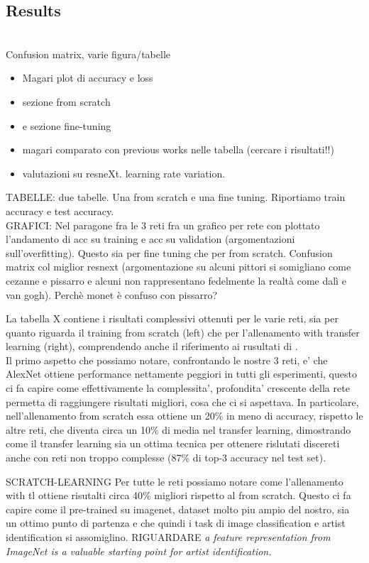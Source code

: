 \documentclass{article}
\begin{document}
\subsection{Results}\mbox{}\\

Confusion matrix, varie figura/tabelle
\begin{itemize}
	\item Magari plot di accuracy e loss
	\item sezione from scratch 
	\item e sezione fine-tuning
	\item magari comparato con previous works nelle tabella (cercare i risultati!!)
	\item valutazioni su resneXt. learning rate variation. 
\end{itemize}
TABELLE: due tabelle. Una from scratch e una fine tuning. Riportiamo train accuracy e test accuracy. \\
GRAFICI: Nel paragone fra le 3 reti fra un grafico per rete con plottato l'andamento di acc su training e acc su validation (argomentazioni sull'overfitting). Questo sia per fine tuning che per from scratch. Confusion matrix col miglior resnext (argomentazione su alcuni pittori si somigliano come cezanne e pissarro e alcuni non rappresentano fedelmente la realtà come dalì e van gogh). Perchè monet è confuso con pissarro?

La tabella X contiene i risultati complessivi ottenuti per le varie reti, sia per quanto riguarda il training from scratch (left) che per l'allenamento with transfer learning (right), comprendendo anche il riferimento ai rusultati di \cite{ArtistIdCNN406}.\\
Il primo aspetto che possiamo notare, confrontando le nostre 3 reti, e' che AlexNet ottiene performance nettamente peggiori in tutti gli esperimenti, questo ci fa capire come effettivamente la complessita', profondita' crescente della rete permetta di raggiungere risultati migliori, cosa che ci si aspettava.
In particolare, nell'allenamento from scratch essa ottiene un 20\% in meno di accuracy, rispetto le altre reti, che diventa circa un 10\% di media nel transfer learning, dimostrando come il transfer learning sia un ottima tecnica per ottenere rislutati discereti anche con reti non troppo complesse (87\% di top-3 accuracy nel test set).

SCRATCH-LEARNING
Per tutte le reti possiamo notare come l'allenamento with tl ottiene risutalti circa 40\% migliori rispetto al from scratch. Questo ci fa capire come il pre-trained su imagenet, dataset molto piu ampio del nostro, sia un ottimo punto di partenza e che quindi i task di image classification e artist identification si assomiglino. RIGUARDARE \textit{a feature representation from ImageNet is a valuable starting point for artist identification. }
\end{document}
